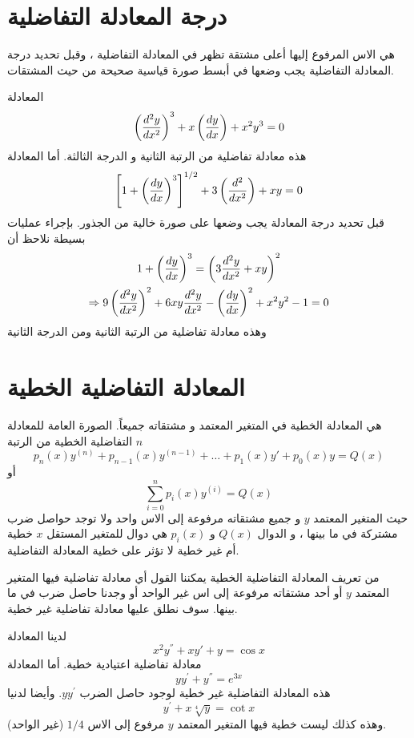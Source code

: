 \section[درجة المعادلة التفاضلية]{درجة المعادلة التفاضلية \cite{diff_eqs_sols_apps}}
    هي الاس المرفوع إليها أعلى مشتقة تظهر في المعادلة التفاضلية ، وقبل تحديد درجة المعادلة التفاضلية يجب وضعها في أبسط صورة قياسية صحيحة من حيث المشتقات.
\newpage
\begin{example}
    المعادلة
    \[
    \left(\frac{d^2y}{dx^2}\right)^3+x\left(\frac{dy}{dx}\right)+x^2y^3=0
    \]
    هذه معادلة تفاضلية من الرتبة الثانية و الدرجة الثالثة. أما المعادلة 
    \[
    \left[1+\left(\frac{dy}{dx}\right)^3\right]^{1/2}+3\left(\frac{d^2}{dx^2}\right)+xy=0
    \]
    قبل تحديد درجة المعادلة يجب وضعها على صورة خالية من الجذور. بإجراء عمليات بسيطة نلاحظ أن
    \begin{gather*}
        1+\left(\frac{dy}{dx}\right)^3=\left(3\frac{d^2y}{dx^2}+xy\right)^2\\
        \Rightarrow 9\left(\frac{d^2y}{dx^2}\right)^2+6xy\frac{d^2y}{dx^2}-\left(\frac{dy}{dx}\right)^2+x^2y^2-1=0
    \end{gather*}
    وهذه معادلة تفاضلية من الرتبة الثانية ومن الدرجة الثانية
\end{example}

\section[المعادلة التفاضلية الخطية]{المعادلة التفاضلية الخطية \cite{diff_eqs_sols_apps}}
    هي المعادلة الخطية في المتغير المعتمد و مشتقاته جميعاً. الصورة العامة للمعادلة التفاضلية الخطية من الرتبة $n$ 
    \[
    p_n(x)y^{(n)}+p_{n-1}(x)y^{(n-1)}+\dots+p_1(x)y'+p_0(x)y=Q(x)
    \]
    أو
    \[
    \sum_{i=0}^{n}p_i(x)y^{(i)}=Q(x)
    \]
    حيث المتغير المعتمد $y$ و جميع مشتقاته مرفوعة إلى الاس واحد ولا توجد حواصل ضرب مشتركة في ما بينها ، و الدوال $Q(x)$ و $p_i(x)$ هي دوال للمتغير المستقل $x$ خطية أم غير خطية لا تؤثر على خطية المعادلة التفاضلية.

\begin{note}
    من تعريف المعادلة التفاضلية الخطية يمكننا القول أي معادلة تفاضلية فيها المتغير المعتمد $y$ أو أحد مشتقاته مرفوعة إلى اس غير الواحد أو وجدنا حاصل ضرب في ما بينها. سوف نطلق عليها معادلة تفاضلية غير خطية.
\end{note}

\begin{example}
    لدينا المعادلة
    \[
    x^2y^{''}+xy'+y=\cos x
    \]
    معادلة تفاضلية اعتيادية خطية. أما المعادلة
    \[
    yy^{'}+y^{''}=e^{3x}
    \]
    هذه المعادلة التفاضلية غير خطية لوجود حاصل الضرب $yy^{'}$. وأيضا لدنيا
\[
y^{'}+x\sqrt[4]{y}=\cot x
\]
وهذه كذلك ليست خطية فيها المتغير المعتمد $y$ مرفوع إلى الاس $1/4$ (غير الواحد).
\end{example}


